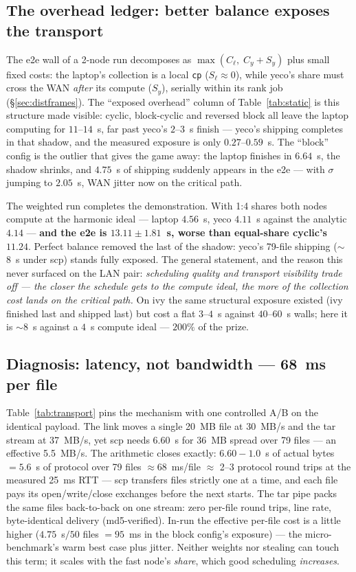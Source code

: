 \documentclass[
	english,
	letterpaper, oneside
]{article}
\begin{document}
\subsection{The overhead ledger: better balance exposes the transport}
\label{sec:ledger}

The e2e wall of a 2-node run decomposes as
$\max(C_\ell,\; C_y + S_y)$ plus small fixed costs: the laptop's
collection is a local \texttt{cp} ($S_\ell \approx 0$), while yeco's
share must cross the WAN \emph{after} its compute ($S_y$), serially
within its rank job (\S\ref{sec:distframes}). The ``exposed overhead''
column of Table~\ref{tab:static} is this structure made visible: cyclic,
block-cyclic and reversed block all leave the laptop computing for
$11$--$14$~s, far past yeco's $2$--$3$~s finish --- yeco's shipping
completes in that shadow, and the measured exposure is only
$0.27$--$0.59$~s. The ``block'' config is the outlier that gives the
game away: the laptop finishes in $6.64$~s, the shadow shrinks, and
$4.75$~s of shipping suddenly appears in the e2e --- with $\sigma$
jumping to $2.05$~s, WAN jitter now on the critical path.

The weighted run completes the demonstration. With 1:4 shares both nodes
compute at the harmonic ideal --- laptop $4.56$~s, yeco $4.11$~s against
the analytic $4.14$ --- \textbf{and the e2e is $13.11\pm1.81$~s, worse
than equal-share cyclic's $11.24$}. Perfect balance removed the last of
the shadow: yeco's 79-file shipping ($\sim$8~s under scp) stands fully
exposed. The general statement, and the reason this never surfaced on
the LAN pair: \emph{scheduling quality and transport visibility trade
off --- the closer the schedule gets to the compute ideal, the more of
the collection cost lands on the critical path.} On ivy the same
structural exposure existed (ivy finished last and shipped last) but
cost a flat $3$--$4$~s against $40$--$60$~s walls; here it is
$\sim$8~s against a $4$~s compute ideal --- $200\%$ of the prize.

\subsection{Diagnosis: latency, not bandwidth --- 68~ms per file}
\label{sec:diagnosis}

Table~\ref{tab:transport} pins the mechanism with one controlled A/B on
the identical payload. The link moves a single 20~MB file at 30~MB/s and
the tar stream at 37~MB/s, yet scp needs $6.60$~s for 36~MB spread over
79 files --- an effective 5.5~MB/s. The arithmetic closes exactly:
$6.60 - 1.0$~s of actual bytes $= 5.6$~s of protocol over 79 files
$\approx 68$~ms/file $\approx$ 2--3 protocol round trips at the measured
25~ms RTT --- scp transfers files strictly one at a time, and each file
pays its open/write/close exchanges before the next starts. The tar pipe
packs the same files back-to-back on one stream: zero per-file round
trips, line rate, byte-identical delivery (md5-verified). In-run the
effective per-file cost is a little higher ($4.75$~s$/50$ files
$= 95$~ms in the block config's exposure) --- the micro-benchmark's warm
best case plus jitter. Neither weights nor stealing can touch this term;
it scales with the fast node's \emph{share}, which good scheduling
\emph{increases}.
\end{document}
